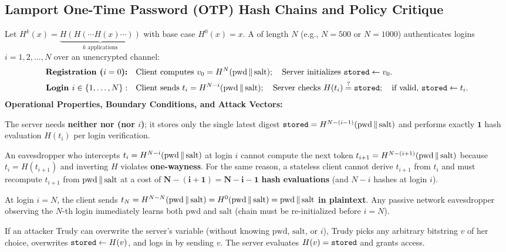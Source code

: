 \subsection{Lamport One-Time Password (OTP) Hash Chains and Policy Critique}
Let $H^k(x) = \underbrace{H(H(\cdots H(x)\cdots))}_{k \text{ applications}}$ with base case $H^0(x) = x$. A  of length $N$ (e.g., $N = 500$ or $N = 1000$) authenticates logins $i = 1, 2, \dots, N$ over an unencrypted channel:
\begin{align*}
  \textbf{Registration ($i = 0$):} \quad & \text{Client computes } v_0 = H^N(\text{pwd} \,\|\, \text{salt}); \quad \text{Server initializes } \texttt{stored} \gets v_0. \\
  \textbf{Login } i \in \{1, \dots, N\}: \quad & \text{Client sends } t_i = H^{N - i}(\text{pwd} \,\|\, \text{salt}); \quad \text{Server checks } H(t_i) \stackrel{?}{=} \texttt{stored}; \quad \text{if valid, } \texttt{stored} \gets t_i.
\end{align*}
\textbf{Operational Properties, Boundary Conditions, and Attack Vectors:}
\begin{compactitem}
  \item {} The server needs \textbf{neither  nor  (nor $i$)}; it stores only the single latest digest $\texttt{stored} = H^{N-(i-1)}(\text{pwd} \,\|\, \text{salt})$ and performs exactly $\mathbf{1}$ hash evaluation $H(t_i)$ per login verification.
  \item {} An eavesdropper who intercepts $t_i = H^{N-i}(\text{pwd} \,\|\, \text{salt})$ at login $i$ cannot compute the next token $t_{i+1} = H^{N-(i+1)}(\text{pwd} \,\|\, \text{salt})$ because $t_i = H(t_{i+1})$ and inverting $H$ violates \textbf{one-wayness}. For the same reason, a stateless client cannot derive $t_{i+1}$ from $t_i$ and must recompute $t_{i+1}$ from $\text{pwd} \,\|\, \text{salt}$ at a cost of $\mathbf{N - (i + 1) = N - i - 1}$ \textbf{hash evaluations} (and $N - i$ hashes at login $i$).
  \item {} At login $i = N$, the client sends $t_N = H^{N - N}(\text{pwd} \,\|\, \text{salt}) = H^0(\text{pwd} \,\|\, \text{salt}) = \text{pwd} \,\|\, \text{salt}$ \textbf{in plaintext}. Any passive network eavesdropper observing the $N$-th login immediately learns both $\text{pwd}$ and $\text{salt}$ (chain must be re-initialized before $i = N$).
  \item {} If an attacker Trudy can overwrite the server's  variable (without knowing $\text{pwd}$, $\text{salt}$, or $i$), Trudy picks any arbitrary bitstring $v$ of her choice, overwrites $\texttt{stored} \gets H(v)$, and logs in by sending $v$. The server evaluates $H(v) = \texttt{stored}$ and grants access.
\end{compactitem}

